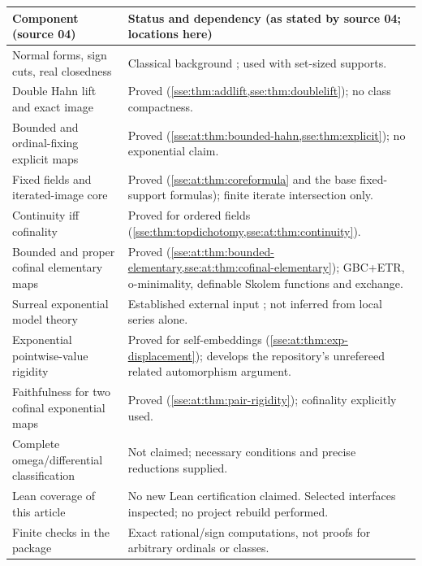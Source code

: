 \documentclass[11pt,a4paper]{article}
\numberwithin{equation}{section}
\theoremstyle{plain}
\theoremstyle{definition}
\theoremstyle{remark}
\begin{document}
\begin{longtable}{P{55mm}P{95mm}}
\toprule
Component (source 04) & Status and dependency (as stated by source 04; locations here) \\
\midrule
\endhead
Normal forms, sign cuts, real closedness & Classical background \cite{Conway,Gonshor}; used with set-sized supports. \\
Double Hahn lift and exact image & Proved (\cref{sse:thm:addlift,sse:thm:doublelift}); no class compactness. \\
Bounded and ordinal-fixing explicit maps & Proved (\cref{sse:at:thm:bounded-hahn,sse:thm:explicit}); no exponential claim. \\
Fixed fields and iterated-image core & Proved (\cref{sse:at:thm:coreformula} and the base fixed-support formulas); finite iterate intersection only. \\
Continuity iff cofinality & Proved for ordered fields (\cref{sse:thm:topdichotomy,sse:at:thm:continuity}). \\
Bounded and proper cofinal elementary maps & Proved (\cref{sse:at:thm:bounded-elementary,sse:at:thm:cofinal-elementary}); GBC+ETR, o-minimality, definable Skolem functions and exchange. \\
Surreal exponential model theory & Established external input \cite{vdDE,Wilkie}; not inferred from local series alone. \\
Exponential pointwise-value rigidity & Proved for self-embeddings (\cref{sse:at:thm:exp-displacement}); develops the repository's unrefereed related automorphism argument. \\
Faithfulness for two cofinal exponential maps & Proved (\cref{sse:at:thm:pair-rigidity}); cofinality explicitly used. \\
Complete omega/differential classification & Not claimed; necessary conditions and precise reductions supplied. \\
Lean coverage of this article & No new Lean certification claimed. Selected interfaces inspected; no project rebuild performed. \\
Finite checks in the package & Exact rational/sign computations, not proofs for arbitrary ordinals or classes. \\
\bottomrule
\end{longtable}
\end{document}
